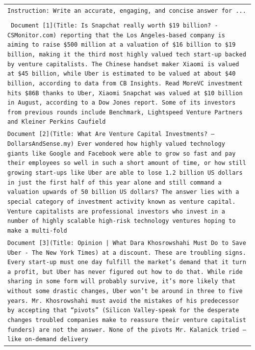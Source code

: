 

\begin{table}[h]
    \centering
    \small
    \begin{tabular}{>{\raggedright\arraybackslash\tt}p{}<{}}
        \toprule
            Instruction: Write an accurate, engaging, and concise answer for ... \\
            \\
            \vspace{-1em}
            Document [1](Title: Is Snapchat really worth \$19 billion? - CSMonitor.com) reporting that the Los Angeles-based company is aiming to raise \$500 million at a valuation of \$16 billion to \$19 billion, making it the third most highly valued tech start-up backed by venture capitalists. The Chinese handset maker Xiaomi is valued at \$45 billion, while Uber is estimated to be valued at about \$40 billion, according to data from CB Insights. Read MoreVC investment hits \$86B thanks to Uber, Xiaomi Snapchat was valued at \$10 billion in August, according to a Dow Jones report. Some of its investors from previous rounds include Benchmark, Lightspeed Venture Partners and Kleiner Perkins Caufield \\
            Document [2](Title: What Are Venture Capital Investments? – DollarsAndSense.my) Ever wondered how highly valued technology giants like Google and Facebook were able to grow so fast and pay their employees so well in such a short amount of time, or how still growing start-ups like Uber are able to lose 1.2 billion US dollars in just the first half of this year alone and still command a valuation upwards of 50 billion US dollars? The answer lies with a special category of investment activity known as venture capital. Venture capitalists are professional investors who invest in a number of highly scalable high-risk technology ventures hoping to make a multi-fold \\
            Document [3](Title: Opinion | What Dara Khosrowshahi Must Do to Save Uber - The New York Times) at a discount. These are troubling signs. Every start-up must one day fulfill the market’s demand that it turn a profit, but Uber has never figured out how to do that. While ride sharing in some form will probably survive, it’s more likely that without some drastic changes, Uber won’t be around in three to five years. Mr. Khosrowshahi must avoid the mistakes of his predecessor by accepting that “pivots” (Silicon Valley-speak for the desperate changes troubled companies make to reassure their venture capitalist funders) are not the answer. None of the pivots Mr. Kalanick tried — like on-demand delivery \\

\end{tabular}
\end{table}
